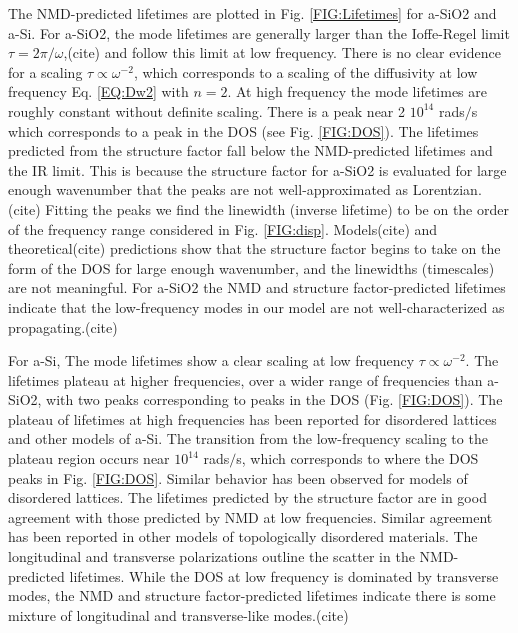 \documentclass[aps,prb,onecolumn,preprint,superscriptaddress,footinbib,amsmath,amssymb,floatfix]{revtex4}
\begin{document}
The NMD-predicted lifetimes are plotted in Fig. \ref{FIG:Lifetimes} 
for a-SiO2 and a-Si. 
For a-SiO2, the mode lifetimes are generally larger than 
the Ioffe-Regel limit $\tau = 2\pi/\omega$,(cite) and follow 
this limit at low frequency. There is no clear evidence for a
scaling $\tau\propto\omega^{-2}$, which 
corresponds to a scaling of the diffusivity at low 
frequency Eq. \eqref{EQ:Dw2} with $n=2$.  
At high frequency the mode lifetimes are roughly constant 
without definite scaling. There is a peak near 
2 $10^{14}$ rads$/$s which corresponds to a peak in the DOS 
(see Fig. \ref{FIG:DOS}).  The lifetimes predicted from the 
structure factor fall below the NMD-predicted lifetimes 
and the IR limit. This is because the structure factor for 
a-SiO2 is evaluated for large enough wavenumber that the 
peaks are not well-approximated as Lorentzian.(cite) Fitting 
the peaks we find the linewidth (inverse lifetime) 
to be on the order of the frequency range considered in 
Fig. \ref{FIG:disp}. 
Models(cite) and theoretical(cite) predictions show that the 
structure factor begins to take on the form of the DOS 
for large enough wavenumber,
\cite{martin-mayor_dynamical_2001,baldi_thermal_2008} and the 
linewidths (timescales) are not meaningful. For a-SiO2 the NMD and 
structure factor-predicted lifetimes indicate that the 
low-frequency modes 
in our model are not well-characterized as propagating.(cite)  

For a-Si, 
The mode lifetimes show a clear scaling at low frequency 
$\tau\propto\omega^{-2}$. The lifetimes plateau at higher frequencies,
over a wider range of frequencies than a-SiO2, with two peaks 
corresponding to peaks in the DOS (Fig. \ref{FIG:DOS}). The plateau of 
lifetimes at high frequencies has been 
reported for disordered lattices
\cite{sheng_heat_1991,larkin_predicting_2013} and 
other models of a-Si.\cite{he_heat_2011} 
The transition from the low-frequency scaling to 
the plateau region occurs near 
$10^{14}$ rads$/$s, which corresponds to where the DOS peaks in Fig. 
\ref{FIG:DOS}. 
Similar behavior has been observed for models of disordered lattices.
\cite{larkin_predicting_2013} The lifetimes predicted by the 
structure factor are in good agreement with those predicted by NMD 
at low frequencies. Similar agreement has been reported in other 
models of topologically disordered materials.
\cite{mazzacurati_low-frequency_1996} 
The longitudinal and transverse polarizations 
outline the scatter in the NMD-predicted lifetimes. While the DOS 
at low frequency is 
dominated by transverse modes, the NMD and 
structure factor-predicted lifetimes indicate there 
is some mixture of longitudinal and transverse-like modes.(cite) 
\end{document}
